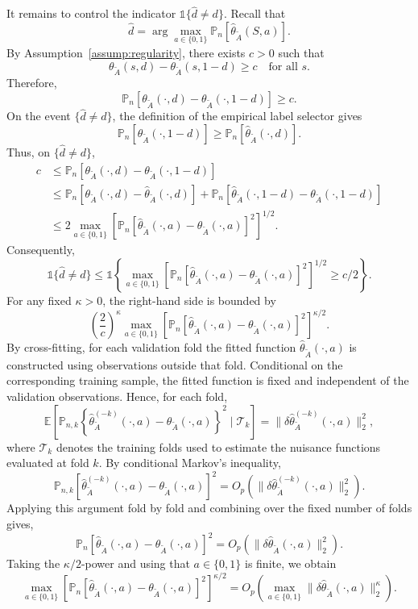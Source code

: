 \documentclass[12pt]{article}
\newcommand{\0}{\boldsymbol{0}}
\begin{document}
It remains to control the indicator \(\mathds 1\{\widehat d\neq d\}\). Recall
that
\[
\widehat d=\arg\max_{a\in\{0,1\}}\mathbb P_n[\widehat\theta_{\widetilde A}(S,a)].
\]
By Assumption~\ref{assump:regularity}, there exists \(c>0\) such that
\[
\theta_{\widetilde A}(s,d)-\theta_{\widetilde A}(s,1-d)\geq c
\quad\text{for all }s.
\]
Therefore,
\[
\mathbb P_n[\theta_{\widetilde A}(\cdot,d)-\theta_{\widetilde A}(\cdot,1-d)]\geq c.
\]
On the event \(\{\widehat d\neq d\}\), the definition of the empirical label selector gives
\[
\mathbb P_n[\widehat\theta_{\widetilde A}(\cdot,1-d)]
\geq
\mathbb P_n[\widehat\theta_{\widetilde A}(\cdot,d)].
\]
Thus, on \(\{\widehat d\neq d\}\),
\[
\begin{aligned}
c
&\leq\mathbb P_n[\theta_{\widetilde A}(\cdot,d)-\theta_{\widetilde A}(\cdot,1-d)] \\
&\leq\mathbb P_n[\theta_{\widetilde A}(\cdot,d)-\widehat\theta_{\widetilde A}(\cdot,d)]+\mathbb P_n
[\widehat\theta_{\widetilde A}(\cdot,1-d)-\theta_{\widetilde A}(\cdot,1-d)] \\
& \leq2\max_{a\in\{0,1\}}\left[\mathbb P_n[\widehat{\theta}_{\widetilde A}(\cdot,a) - \theta_{\widetilde A}(\cdot,a)]^2\right]^{1/2}.
\end{aligned}
\]
Consequently,
\[
\mathds 1\{\widehat d\neq d\}\leq\mathds 1\left\{\max_{a\in\{0,1\}}\left[\mathbb P_n[\widehat{\theta}_{\widetilde A}(\cdot,a) - \theta_{\widetilde A}(\cdot,a)]^2\right]^{1/2}\geq c/2\right\}.
\]
For any fixed \(\kappa>0\), the right-hand side is bounded by
\[
\left(\frac{2}{c}\right)^\kappa
\max_{a\in\{0,1\}}\left[\mathbb P_n[\widehat{\theta}_{\widetilde A}(\cdot,a) - \theta_{\widetilde A}(\cdot,a)]^2\right]^{\kappa/2} .
\]
By cross-fitting, for each validation fold the fitted function \(\widehat\theta_{\widetilde A}(\cdot,a)\) is constructed using observations outside that fold. Conditional on the corresponding training sample, the fitted function is fixed and independent of the validation observations. Hence, for each fold,
\[
\mathbb E\left[\mathbb P_{n,k}\left\{\widehat\theta_{\widetilde A}^{(-k)}(\cdot,a)-\theta_{\widetilde A}(\cdot,a)\right\}^2\mid \mathcal T_k\right]=\|\delta \widehat \theta^{(-k)}_{\widetilde A}(\cdot,a)\|_2^2,
\]
where \(\mathcal T_k\) denotes the training folds used to estimate the nuisance
functions evaluated at fold $k$. By conditional Markov's inequality,
\[
\mathbb P_{n,k}\left[\widehat\theta_{\widetilde A}^{(-k)}(\cdot,a)-\theta_{\widetilde A}(\cdot,a)\right]^2=O_p\left(\|\delta \widehat \theta^{(-k)}_{\widetilde A}(\cdot,a)\|_2^2\right).
\]
Applying this argument fold by fold and combining over the fixed number of folds gives, 
\[
\mathbb P_{n}\left[\widehat\theta_{\widetilde A}(\cdot,a)-\theta_{\widetilde A}(\cdot,a)\right]^2=O_p\left(\|\delta \widehat \theta_{\widetilde A}(\cdot,a)\|_2^2\right).
\]
Taking the \(\kappa/2\)-power and using that \(a\in\{0,1\}\) is finite, we obtain
\[
\max_{a\in\{0,1\}}\left[\mathbb P_n[\widehat\theta_{\widetilde A}(\cdot,a)-\theta_{\widetilde A}(\cdot,a)]^2\right]^{\kappa/2}
=O_p\left(\max_{a\in\{0,1\}}\|\delta \widehat \theta_{\widetilde A}(\cdot,a)\|_2^\kappa\right).
\]
\end{document}
